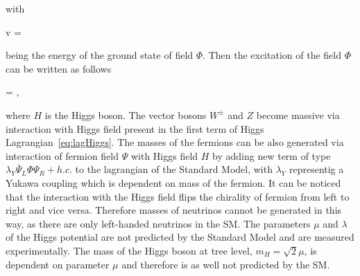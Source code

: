 with

{
v = 
}

being the energy of the ground state of field $\Phi$. Then the excitation of the field $\Phi$ can be written as follows

{
    \Phi = ,
}

where $H$ is the Higgs boson. The vector bosons $W^{\pm}$ and $Z$ become massive via interaction with Higgs field present in the first term of Higgs Lagrangian~\ref{eq:lagHiggs}. The masses of the fermions can be also generated via interaction of fermion field  $\Psi$ with Higgs field $H$ by adding new term of type $\lambda_{Y} \bar{\Psi}_{L} \Phi \Psi_{R} + h.c.$ to the lagrangian of the Standard Model, with $\lambda_{Y}$ representig a Yukawa coupling which is dependent on mass of the fermion. It can be noticed that the interaction with the Higgs field flips the chirality of fermion from left to right and vice versa. Therefore masses of neutrinos cannot be generated in this way, as there are only left-handed neutrinos in the SM. The parameters $\mu$ and $\lambda$ of the Higgs potential are not predicted by the Standard Model and are measured experimentally. The mass of the Higgs boson at tree level, $m_{H} = \sqrt{2}\mu$, is dependent on parameter $\mu$ and therefore is as well not predicted by the SM. 


